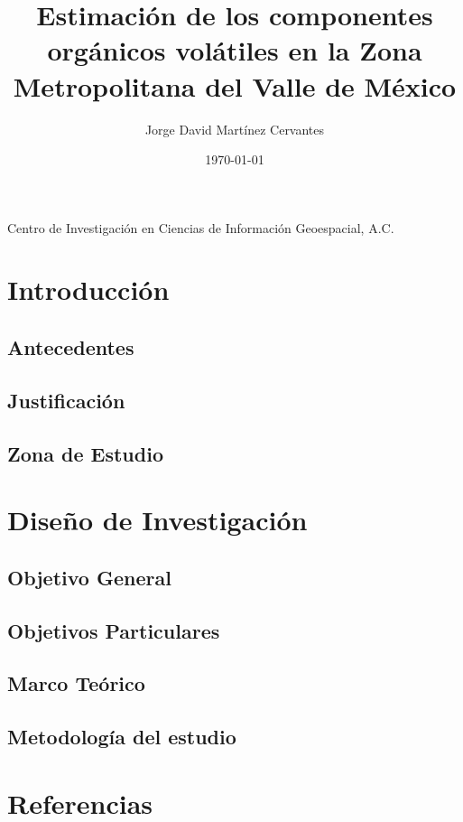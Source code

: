 \documentclass[10pt]{article}
\title{\renewcommand{\baselinestretch}{1.17}\bf%
Estimación de los componentes orgánicos volátiles en la Zona Metropolitana del Valle de México
}
\author{%
Jorge David Martínez Cervantes
}
\begin{document}
\date{\today}

\maketitle

\vspace{-0.5cm}

\begin{center}
{\footnotesize 
Centro de Investigación en Ciencias de Información Geoespacial, A.C. \\
}
\end{center}


\section{Introducción}\label{sec:1}


\subsection{Antecedentes}\label{subsec:1.1}


\subsection{Justificación}\label{subsec:1.2}


\subsection{Zona de Estudio}\label{subsec:1.3}


\section{Diseño de Investigación}\label{sec:2}


\subsection{Objetivo General}\label{subsec:2.1}


\subsection{Objetivos Particulares}\label{subsec:2.2}


\subsection{Marco Teórico}\label{subsec:2.3}


\subsection{Metodología del estudio}\label{subsec:2.4}


\section{Referencias}\label{sec:3}

\newpage
\end{document}
